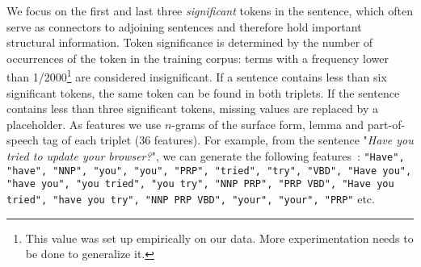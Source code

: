 We focus on the first and last three \textit{significant} tokens in the sentence, which often serve as connectors to adjoining sentences and therefore hold important structural information.
Token significance is determined by the number of occurrences of the token in the training corpus: terms with a frequency lower than 1/2000\footnote{This value was set up empirically on our data. More experimentation needs to be done to generalize it.} are considered insignificant. If a sentence contains less than six significant tokens, the same token can be found in both triplets. If the sentence contains less than three significant tokens, missing values are replaced by a placeholder.
As features we use $n$-grams of the surface form, lemma and part-of-speech tag of each triplet (36 features).
For example, from the sentence "\textit{Have you tried to update your browser?}", we can generate the following features~: \texttt{\footnotesize "Have", "have", "NNP", "you", "you", "PRP", "tried", "try", "VBD", "Have you", "have you", "you tried", "you try", "NNP PRP", "PRP VBD", "Have you tried", "have you try", "NNP PRP VBD", "your", "your", "PRP"} etc.

%


